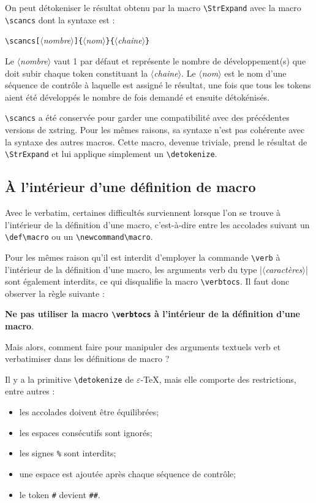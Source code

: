\documentclass[a4paper,10pt,french]{article}
\newcommand\guill[1]{\og{}#1\fg{}}
\newcommand\argu[1]{$\langle$\textit{#1}$\rangle$}
\newcommand\ARGU[1]{\texttt{\color{black}\{}\argu{#1}\texttt{\color{black}\}}}
\newcommand\arguC[1]{\texttt{\color{black}[}\argu{#1}\texttt{\color{black}]}}
\newcommand\Xstring{\textsf{xstring}\xspace}
\begin{document}
{On peut détokeniser le résultat obtenu par la macro \verb-\StrExpand- avec la macro \verb-\scancs- dont la syntaxe est :\par\nobreak\medskip
\verb|\scancs|\arguC{nombre}\ARGU{nom}\ARGU{chaine}\par\nobreak\smallskip

Le \argu{nombre} vaut 1 par défaut et représente le nombre de développement(s) que doit subir chaque token constituant la \argu{chaine}. Le \argu{nom} est le nom d'une séquence de contrôle à laquelle est assigné le résultat, une fois que tous les tokens aient été développés le nombre de fois demandé et ensuite détokénisés.\smallskip

\verb-\scancs-  a été conservée pour garder une compatibilité avec des précédentes versions de \Xstring. Pour les mêmes raisons, sa syntaxe n'est pas cohérente avec la syntaxe des autres macros. Cette macro, devenue triviale, prend le résultat de \verb|\StrExpand| et lui applique simplement un \verb|\detokenize|.

\subsection{À l'intérieur d'une définition de macro}
Avec le verbatim, certaines difficultés surviennent lorsque l'on se trouve à l'intérieur de la définition d'une macro, c'est-à-dire entre les accolades suivant un \verb|\def\macro| ou un \verb|\newcommand\macro|.\medskip

Pour les mêmes raison qu'il est interdit d'employer la commande \verb|\verb| à l'intérieur de la définition d'une macro, les arguments  verb du type |\argu{caractères}| sont également interdits, ce qui disqualifie la macro \verb|\verbtocs|. Il faut donc observer la règle suivante :\par\medskip
\hfill{\bfseries Ne pas utiliser la macro \verb-\verbtocs- à l'intérieur de la définition d'une macro}.\hfill{}\bigskip

Mais alors, comment faire pour manipuler des arguments textuels verb et \guill{verbatimiser} dans les définitions de macro ?\bigskip

Il y a la primitive \verb|\detokenize| de $\varepsilon$-\TeX, mais elle comporte des restrictions, entre autres :
\begin{itemize}
	\item les accolades doivent être équilibrées;
	\item les espaces consécutifs sont ignorés;
	\item les signes \verb|%| sont interdits;
	\item une espace est ajoutée après chaque séquence de contrôle;
	\item le token \verb|#| devient \verb|##|.
\end{itemize}
\medskip

}
\end{document}
